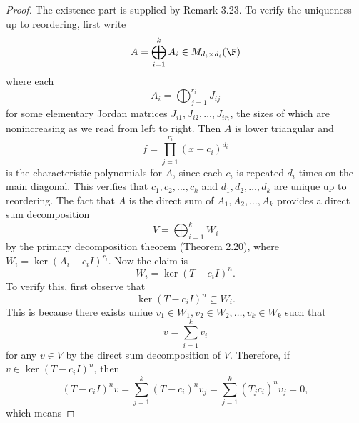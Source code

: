 \documentclass[linearalgebraII]{subfiles}
\begin{document}
    \begin{proof}
        The existence part is supplied by Remark 3.23. To verify the uniqueness up to reordering, first write
        \begin{equation*}
            A = \bigoplus^{k}_{i=1} A_i\in M_{d_i\times d_i}(\F) 
        \end{equation*}
        where each
        \begin{equation*}
            A_i = \bigoplus^{r_i}_{j=1} J_{ij}
        \end{equation*}
        for some elementary Jordan matrices $J_{i 1}, J_{i 2}, \ldots, J_{ir_i}$, the sizes of which are nonincreasing as we read from left to right. Then $A$ is lower triangular and
        \begin{equation*}
            f = \prod^{r_i}_{j=1} \left( x-c_i \right) ^{d_i}
        \end{equation*}
        is the characteristic polynomials for $A$, since each $c_i$ is repeated $d_i$ times on the main diagonal. This verifies that $c_1,c_2,\ldots,c_k$ and $d_1,d_2,\ldots,d_k$ are unique up to reordering. The fact that $A$ is the direct sum of $A_1,A_2,\ldots,A_k$ provides a direct sum decomposition
        \begin{equation*}
            V = \bigoplus^{k}_{i=1} W_i
        \end{equation*}
        by the primary decomposition theorem (Theorem 2.20), where $W_i = \ker\left( A_i-c_iI \right) ^{r_i}$. Now the claim is
        \begin{equation*}
            W_i = \ker\left( T-c_iI \right) ^n.
        \end{equation*}
        To verify this, first observe that
        \begin{equation*}
            \ker\left( T-c_iI \right) ^n \subseteq W_i.
        \end{equation*}
        This is because there exists uniue $v_1\in W_1, v_2\in W_2,\ldots, v_k\in W_k$ such that
        \begin{equation*}
            v = \sum^{k}_{i=1} v_i
        \end{equation*}
        for any $v\in V$ by the direct sum decomposition of $V$. Therefore, if $v\in\ker\left( T-c_iI \right) ^n$, then
        \begin{equation*}
            \left( T-c_iI \right) ^nv = \sum^{k}_{j=1} \left( T-c_i \right)^nv_j = \sum^{k}_{j=1} \left( T_jc_i \right)^n v_j = 0, 
        \end{equation*}
        which means

\end{proof}
\end{document}
